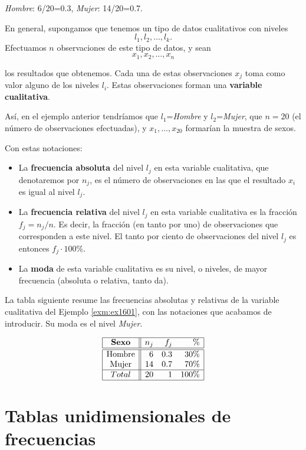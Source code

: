 \documentclass[
]{book}
\theoremstyle{definition}
\theoremstyle{definition}
\theoremstyle{definition}
\theoremstyle{remark}
\begin{document}
\emph{Hombre}: 6/20=0.3, \emph{Mujer}: 14/20=0.7.

En general, supongamos que tenemos un tipo de datos cualitativos con niveles
\[
l_1, l_2, \ldots, l_k.
\]
Efectuamos \(n\) observaciones de este tipo de datos, y sean
\[
x_1, x_2, \ldots, x_n
\]

los resultados que obtenemos.
Cada una de estas observaciones \(x_j\) toma como valor alguno de los niveles \(l_i\). Estas observaciones forman una \textbf{variable cualitativa}.

Así, en el ejemplo anterior tendríamos que \(l_1\)=\emph{Hombre} y \(l_2\)=\emph{Mujer},
que \(n=20\) (el número de observaciones efectuadas), y \(x_1, \ldots, x_{20}\) formarían la muestra de sexos.

Con estas notaciones:

\begin{itemize}
\item
  La \textbf{frecuencia absoluta} del nivel \(l_j\) en esta variable cualitativa, que denotaremos por \(n_j\), es el número de observaciones en las que el resultado \(x_i\) es igual al nivel \(l_j\).
\item
  La \textbf{frecuencia relativa} del nivel \(l_j\) en esta variable cualitativa es la fracción \(f_j={n_j}/{n}\). Es decir, la fracción (en tanto por uno) de observaciones que corresponden a este nivel. El tanto por ciento de observaciones del nivel \(l_j\) es entonces \(f_j\cdot 100\%\).
\item
  La \textbf{moda} de esta variable cualitativa es su nivel, o niveles, de mayor frecuencia (absoluta o relativa, tanto da).
\end{itemize}

La tabla siguiente resume las frecuencias absolutas y relativas de la variable cualitativa del Ejemplo \ref{exm:ex1601}, con las notaciones que acabamos de introducir. Su moda es el nivel \emph{Mujer}.

\[
\begin{array}{|c||rrr|}
\hline \mathbf{Sexo} & n_j & f_j & \% \\\hline\hline
\mbox{Hombre} & 6 & 0.3 & 30\% \\
\mbox{Mujer} & 14 & 0.7 & 70 \% \\\hline
Total & 20 & 1 & 100\% \\\hline
\end{array}
\]

\hypertarget{tablas-unidimensionales-de-frecuencias}{%
\section{Tablas unidimensionales de frecuencias}\label{tablas-unidimensionales-de-frecuencias}}
\end{document}
